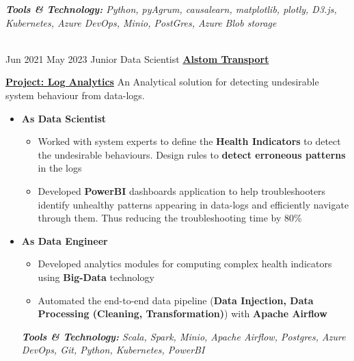 \documentclass[letterpaper]{DS_class_file} %
\begin{document}
\begin{twenty}
{\begin{itemize}
\begin{itemize}
        \end{itemize}
        \textit{\textbf{Tools \& Technology:} Python, pyAgrum, causalearn, matplotlib, plotly, D3.js, Kubernetes, Azure DevOps, Minio, PostGres, Azure Blob storage}
        \end{itemize}
        }
    \\
    \twentyitem
		{Jun 2021}
		{May 2023}
		{Junior Data Scientist}
		{\href{https://www.alstom.com/alstom-india}{\textbf{Alstom Transport}}}
		{}
		{
        \underline{\textbf{Project: Log Analytics}}
        \vspace{0.1cm} 
        \newline
        An Analytical solution for detecting undesirable system behaviour from data-logs. 
        \begin{itemize}
        \item \textbf{As Data Scientist}
            \begin{itemize}
                \item Worked with system experts to define the \textbf{Health Indicators} to detect the undesirable behaviours. Design rules to \textbf{detect erroneous patterns} in the logs 
                \item Developed \textbf{PowerBI} dashboards application to help troubleshooters identify unhealthy patterns appearing in data-logs and efficiently navigate through them. Thus reducing the troubleshooting time by 80\%
            \end{itemize}
        \item \textbf{As Data Engineer}
            \begin{itemize}
                \item Developed analytics modules for computing complex health indicators using \textbf{Big-Data} technology
                \item Automated the end-to-end data pipeline (\textbf{Data Injection, Data Processing (Cleaning, Transformation)}) with \textbf{Apache Airflow}
            \end{itemize}
        \textit{\textbf{Tools \& Technology:} Scala, Spark, Minio, Apache Airflow, Postgres, Azure DevOps, Git, Python, Kubernetes, PowerBI}
        \end{itemize}
}
\end{twenty}
\end{document}
